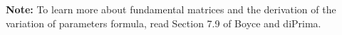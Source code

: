 \documentclass[12pt,letterpaper]{hmcpset}
\begin{document}
\begin{problem}[3 cont.]
    \textbf{Note:} To learn more about fundamental matrices and the
    derivation of the variation of parameters formula, read Section
    7.9 of Boyce and diPrima.
\end{problem}
\begin{solution}
    \null\vfill
\end{solution}
\end{document}
